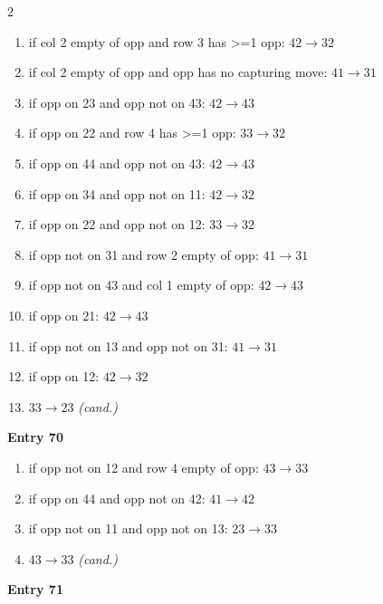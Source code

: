 \begin{multicols}{2}
\begin{tikzpicture}[scale=0.24]
\end{tikzpicture}
\nopagebreak\begin{enumerate}[topsep=1pt,itemsep=0pt,parsep=0pt,leftmargin=2.2em,label=\arabic*.]
\item if col 2 empty of opp and row 3 has >=1 opp: $42\!\to\!32$
\item if col 2 empty of opp and opp has no capturing move: $41\!\to\!31$
\item if opp on 23 and opp not on 43: $42\!\to\!43$
\item if opp on 22 and row 4 has >=1 opp: $33\!\to\!32$
\item if opp on 44 and opp not on 43: $42\!\to\!43$
\item if opp on 34 and opp not on 11: $42\!\to\!32$
\item if opp on 22 and opp not on 12: $33\!\to\!32$
\item if opp not on 31 and row 2 empty of opp: $41\!\to\!31$
\item if opp not on 43 and col 1 empty of opp: $42\!\to\!43$
\item if opp on 21: $42\!\to\!43$
\item if opp not on 13 and opp not on 31: $41\!\to\!31$
\item if opp on 12: $42\!\to\!32$
\item $33\!\to\!23$ \hfill\textit{(cand.)}
\end{enumerate}\smallskip
\noindent\textbf{Entry 70} \; 
\nopagebreak\begin{enumerate}[topsep=1pt,itemsep=0pt,parsep=0pt,leftmargin=2.2em,label=\arabic*.]
\item if opp not on 12 and row 4 empty of opp: $43\!\to\!33$
\item if opp on 44 and opp not on 42: $41\!\to\!42$
\item if opp not on 11 and opp not on 13: $23\!\to\!33$
\item $43\!\to\!33$ \hfill\textit{(cand.)}
\end{enumerate}\smallskip
\noindent\textbf{Entry 71} \; 
\end{multicols}
